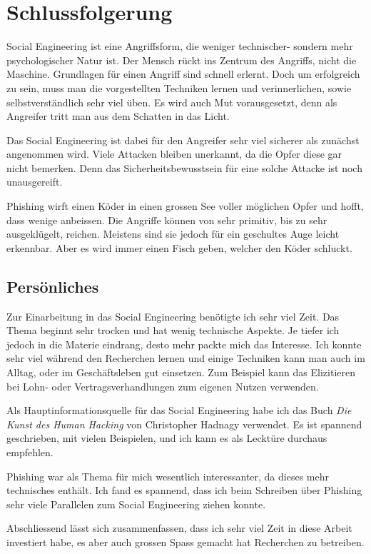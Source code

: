 \chapter{Schlussfolgerung}

Social Engineering ist eine Angriffsform, die weniger technischer- sondern mehr psychologischer Natur ist. Der Mensch rückt ins Zentrum des Angriffs, nicht die Maschine. Grundlagen für einen Angriff sind schnell erlernt. Doch um erfolgreich zu sein, muss man die vorgestellten Techniken lernen und verinnerlichen, sowie selbstverständlich sehr viel üben. Es wird auch Mut vorausgesetzt, denn als Angreifer tritt man aus dem Schatten in das Licht. 

Das Social Engineering ist dabei für den Angreifer sehr viel sicherer als zunächst angenommen wird. Viele Attacken bleiben unerkannt, da die Opfer diese gar nicht bemerken. Denn das Sicherheitsbewusstsein für eine solche Attacke ist noch unausgereift.

Phishing wirft einen Köder in einen grossen See voller möglichen Opfer und hofft, dass wenige anbeissen. Die Angriffe können von sehr primitiv, bis zu sehr ausgeklügelt, reichen. Meistens sind sie jedoch für ein geschultes Auge leicht erkennbar. Aber es wird immer einen Fisch geben, welcher den Köder schluckt.

\section{Persönliches}
Zur Einarbeitung in das Social Engineering benötigte ich sehr viel Zeit. Das Thema beginnt sehr trocken und hat wenig technische Aspekte. Je tiefer ich jedoch in die Materie eindrang, desto mehr packte mich das Interesse. Ich konnte sehr viel während den Recherchen lernen und einige Techniken kann man auch im Alltag, oder im Geschäftsleben gut einsetzen. Zum Beispiel kann das Elizitieren bei Lohn- oder Vertragsverhandlungen zum eigenen Nutzen verwenden.

Als Hauptinformationsquelle für das Social Engineering habe ich das Buch \textit{Die Kunst des Human Hacking} von Christopher Hadnagy verwendet. Es ist spannend geschrieben, mit vielen Beispielen, und ich kann es als Lecktüre durchaus empfehlen.

Phishing war als Thema für mich wesentlich interessanter, da dieses mehr technisches enthält. Ich fand es spannend, dass ich beim Schreiben über Phishing sehr viele Parallelen zum Social Engineering ziehen konnte.

Abschliessend lässt sich zusammenfassen, dass ich sehr viel Zeit in diese Arbeit investiert habe, es aber auch grossen Spass gemacht hat Recherchen zu betreiben.



\glsaddall
